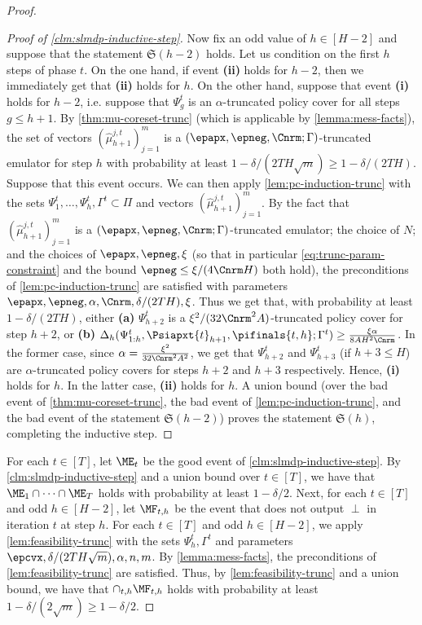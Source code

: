 \documentclass[11pt, oneside]{article}
\theoremstyle{plain}
\theoremstyle{definition}
\numberwithin{theorem}{section}
\newcommand{\trunccore}{truncated emulator\xspace}
\renewcommand{\^}[1]{^{(#1)}}
\begin{document}
\begin{proof}
\begin{proof}[Proof of \cref{clm:slmdp-inductive-step}]
  Now fix an odd value of $h \in [H-2]$ and suppose that the statement $\mathfrak{S}(h-2)$ holds. Let us condition on the first $h$ steps of phase $t$. On the one hand, if event \textbf{(ii)} holds for $h-2$, then we immediately get that \textbf{(ii)} holds for $h$. On the other hand, suppose that event \textbf{(i)} holds for $h-2$, i.e. suppose that $\Psi_g^t$ is an $\alpha$-truncated policy cover for all steps $g \leq h+1$. By \cref{thm:mu-coreset-trunc} (which is applicable by \cref{lemma:mess-facts}), the set of vectors $(\hat\mu_{h+1}^{j,t})_{j=1}^m$ is a $(\epapx,\epneg,\Cnrm; \Gamma)$-\trunccore{} for step $h$ with probability at least $1-\delta/(2TH\sqrt{m}) \geq 1-\delta/(2TH)$. Suppose that this event occurs. We can then apply \cref{lem:pc-induction-trunc} with the sets $\Psi_1^t, \ldots, \Psi_h^t, \Gamma^t \subset \Pi$ and vectors $(\hat\mu_{h+1}^{j,t})_{j=1}^m$. By the fact that $(\hat\mu_{h+1}^{j,t})_{j=1}^m$ is a $(\epapx,\epneg,\Cnrm; \Gamma)$-\trunccore{}; the choice of $N$; and the choices of $\epapx,\epneg,\xi$ (so that in particular \cref{eq:trunc-param-constraint} and the bound $\epneg \leq \xi/(4\Cnrm H)$ both hold), the preconditions of \cref{lem:pc-induction-trunc} are satisfied with parameters $\epapx,\epneg,\alpha,\Cnrm,\delta/(2TH),\xi$. Thus we get that, with probability at least $1-\delta/(2TH)$, either \textbf{(a)} $\Psi_{h+2}^t$ is a $\xi^2/(32\Cnrm^2 A)$-truncated policy cover for step $h+2$, or \textbf{(b)} $\Delta_h(\Psi_{1:h}^t, \Psiapxt{t}_{h+1}, \pifinals{t,h};\Gamma^t) \geq \frac{\xi\alpha}{8AH^2 \Cnrm}$. In the former case, since $\alpha = \frac{\xi^2}{32\Cnrm^2 A^2}$, we get that $\Psi_{h+2}^t$ and $\Psi_{h+3}^t$ (if $h+3 \leq H$) are $\alpha$-truncated policy covers for steps $h+2$ and $h+3$ respectively. Hence, \textbf{(i)} holds for $h$. In the latter case, \textbf{(ii)} holds for $h$. A union bound (over the bad event of \cref{thm:mu-coreset-trunc}, the bad event of \cref{lem:pc-induction-trunc}, and the bad event of the statement $\mathfrak{S}(h-2)$) proves the statement $\mathfrak{S}(h)$, completing the inductive step.
\end{proof}

  For each $t \in [T]$, let $\ME_t$ be the good event of \cref{clm:slmdp-inductive-step}. By \cref{clm:slmdp-inductive-step} and a union bound over $t \in [T]$, we have that $\ME_1\cap\dots\cap\ME_T$ holds with probability at least $1-\delta/2$. Next, for each $t \in [T]$ and odd $h \in [H-2]$, let $\MF_{t,h}$ be the event that \ESCt does not output $\perp$ in iteration $t$ at step $h$. For each $t \in [T]$ and odd $h \in [H-2]$, we apply \cref{lem:feasibility-trunc} with the sets $\Psi_h^t,\Gamma^t$ and parameters $\epcvx, \delta/(2TH\sqrt{m}),\alpha,n,m$. By \cref{lemma:mess-facts}, the preconditions of \cref{lem:feasibility-trunc} are satisfied. Thus, by \cref{lem:feasibility-trunc} and a union bound, we have that $\cap_{t,h} \MF_{t,h}$ holds with probability at least $1-\delta/(2\sqrt{m}) \geq 1-\delta/2$. 
  

\end{proof}
\end{document}
